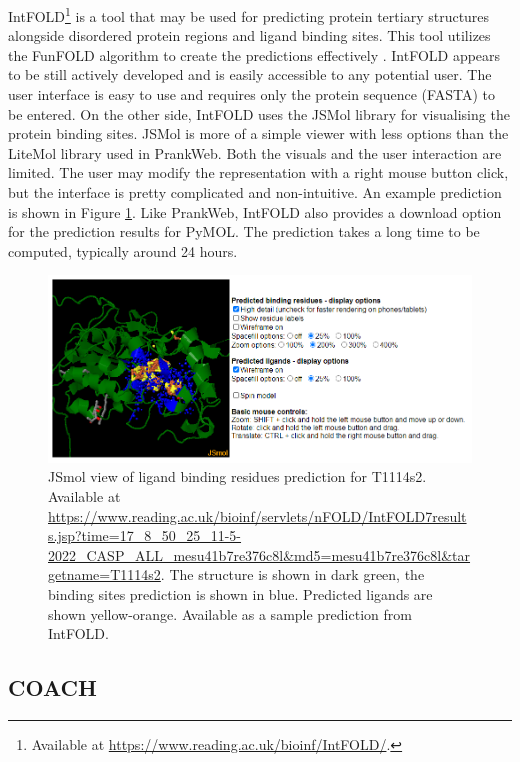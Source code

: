 IntFOLD\footnote{Available at \url{https://www.reading.ac.uk/bioinf/IntFOLD/}.} is a tool that may be used for predicting protein tertiary structures alongside disordered protein regions and ligand binding sites. This tool utilizes the FunFOLD algorithm to create the predictions effectively \cite{10.1093/nar/gkz322}. IntFOLD appears to be still actively developed and is easily accessible to any potential user. The user interface is easy to use and requires only the protein sequence (FASTA) to be entered. On the other side, IntFOLD uses the JSMol library for visualising the protein binding sites. JSMol is more of a simple viewer with less options than the LiteMol library used in PrankWeb. Both the visuals and the user interaction are limited. The user may modify the representation with a right mouse button click, but the interface is pretty complicated and non-intuitive. An example prediction is shown in Figure \ref{fig:intfold_prediction}. Like PrankWeb, IntFOLD also provides a download option for the prediction results for PyMOL. The prediction takes a long time to be computed, typically around 24 hours.

\begin{figure}
    \centering
    \includegraphics[width=\linewidth]{img/intfold_prediction.png}
    \caption{JSmol view of ligand binding residues prediction for T1114s2.
    Available at \url{https://www.reading.ac.uk/bioinf/servlets/nFOLD/IntFOLD7results.jsp?time=17_8_50_25_11-5-2022_CASP_ALL_mesu41b7re376c8l&md5=mesu41b7re376c8l&targetname=T1114s2}. The structure is shown in dark green, the binding sites prediction is shown in blue. Predicted ligands are shown yellow-orange. Available as a sample prediction from IntFOLD.}
    \label{fig:intfold_prediction}
\end{figure}

\subsection{COACH}
\label{subsec:coach}

